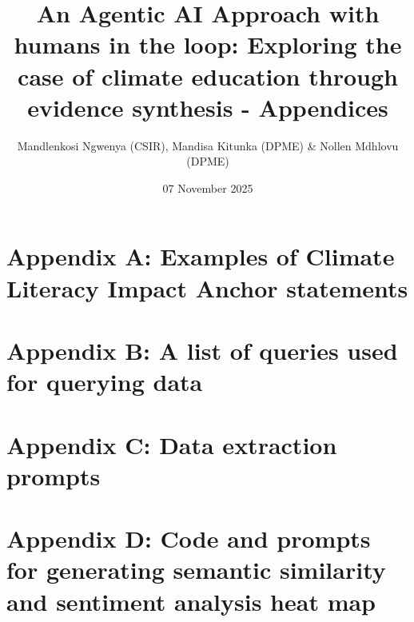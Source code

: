 \documentclass[11pt,a4paper]{article}
\title{An Agentic AI Approach with humans in the loop: Exploring the case of climate education through evidence synthesis - Appendices}
\author{Mandlenkosi Ngwenya (CSIR), Mandisa Kitunka (DPME) & Nollen Mdhlovu (DPME) }
\date{07 November 2025}
\begin{document}
\maketitle
\tableofcontents
\newpage

\section{Appendix A: Examples of Climate Literacy Impact Anchor statements}


\newpage
\section{Appendix B: A list of queries used for querying data}


\newpage
\section{Appendix C: Data extraction prompts}


\newpage
\section{Appendix D: Code and prompts for generating semantic similarity and sentiment analysis heat map}

\end{document}
